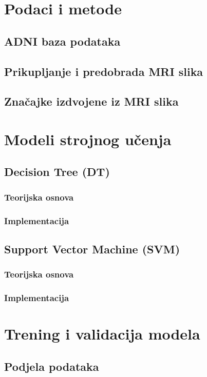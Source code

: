\documentclass[zavrsnirad]{fer}
\begin{document}
\section{Podaci i metode}
\subsection{ADNI baza podataka}
\subsection{Prikupljanje i predobrada MRI slika}
\subsection{Značajke izdvojene iz MRI slika}

\section{Modeli strojnog učenja}
\subsection{Decision Tree (DT)}
\subsubsection{Teorijska osnova}
\subsubsection{Implementacija}
\subsection{Support Vector Machine (SVM)}
\subsubsection{Teorijska osnova}
\subsubsection{Implementacija}

\section{Trening i validacija modela}
\subsection{Podjela podataka}
\end{document}
